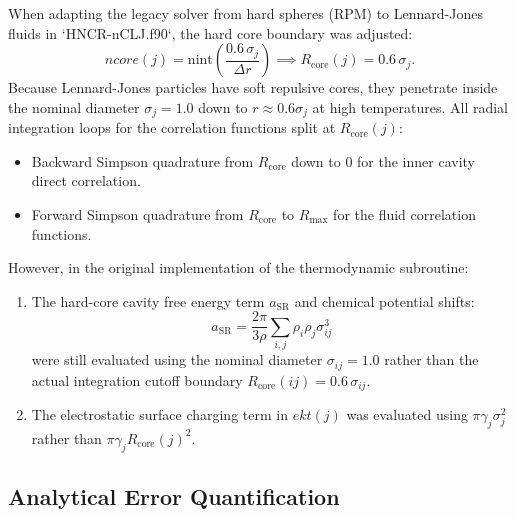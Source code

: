 \documentclass[11pt,a4paper]{article}
\begin{document}
When adapting the legacy solver from hard spheres (RPM) to Lennard-Jones fluids in `HNCR-nCLJ.f90`, the hard core boundary was adjusted:
\begin{equation}
ncore(j) = \text{nint}\left( \frac{0.6 \, \sigma_j}{\Delta r} \right) \implies R_{\text{core}}(j) = 0.6 \, \sigma_j.
\end{equation}
Because Lennard-Jones particles have soft repulsive cores, they penetrate inside the nominal diameter $\sigma_j = 1.0$ down to $r \approx 0.6\sigma_j$ at high temperatures. All radial integration loops for the correlation functions split at $R_{\text{core}}(j)$:
\begin{itemize}
    \item Backward Simpson quadrature from $R_{\text{core}}$ down to 0 for the inner cavity direct correlation.
    \item Forward Simpson quadrature from $R_{\text{core}}$ to $R_{\text{max}}$ for the fluid correlation functions.
\end{itemize}

However, in the original implementation of the thermodynamic subroutine:
\begin{enumerate}
    \item The hard-core cavity free energy term $a_{\text{SR}}$ and chemical potential shifts:
    \begin{equation}
    a_{\text{SR}} = \frac{2\pi}{3\rho} \sum_{i,j} \rho_i \rho_j \sigma_{ij}^3
    \end{equation}
    were still evaluated using the nominal diameter $\sigma_{ij} = 1.0$ rather than the actual integration cutoff boundary $R_{\text{core}}(ij) = 0.6 \, \sigma_{ij}$.
    \item The electrostatic surface charging term in $ekt(j)$ was evaluated using $\pi \gamma_j \sigma_j^2$ rather than $\pi \gamma_j R_{\text{core}}(j)^2$.
\end{enumerate}

\subsection{Analytical Error Quantification}
\end{document}
